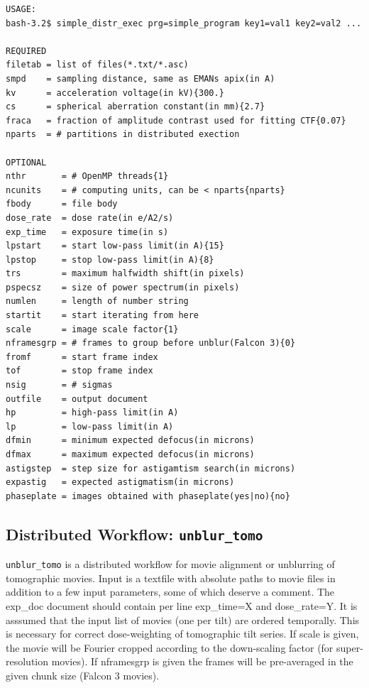 \documentclass[a4paper,11pt]{article}
\newcommand{\prgname}[1]{\textcolor{NavyBlue}{\texttt{#1}}}
\begin{document}
\begin{verbatim}
USAGE:
bash-3.2$ simple_distr_exec prg=simple_program key1=val1 key2=val2 ...

REQUIRED
filetab = list of files(*.txt/*.asc)
smpd    = sampling distance, same as EMANs apix(in A)
kv      = acceleration voltage(in kV){300.}
cs      = spherical aberration constant(in mm){2.7}
fraca   = fraction of amplitude contrast used for fitting CTF{0.07}
nparts  = # partitions in distributed exection

OPTIONAL
nthr       = # OpenMP threads{1}
ncunits    = # computing units, can be < nparts{nparts}
fbody      = file body
dose_rate  = dose rate(in e/A2/s)
exp_time   = exposure time(in s)
lpstart    = start low-pass limit(in A){15}
lpstop     = stop low-pass limit(in A){8}
trs        = maximum halfwidth shift(in pixels)
pspecsz    = size of power spectrum(in pixels)
numlen     = length of number string
startit    = start iterating from here
scale      = image scale factor{1}
nframesgrp = # frames to group before unblur(Falcon 3){0}
fromf      = start frame index
tof        = stop frame index
nsig       = # sigmas
outfile    = output document
hp         = high-pass limit(in A)
lp         = low-pass limit(in A)
dfmin      = minimum expected defocus(in microns)
dfmax      = maximum expected defocus(in microns)
astigstep  = step size for astigamtism search(in microns)
expastig   = expected astigmatism(in microns)
phaseplate = images obtained with phaseplate(yes|no){no}
\end{verbatim}

\subsection{Distributed Workflow: \prgname{unblur\_tomo}}
\label{unblur_tomo}
\prgname{unblur\_tomo} is a distributed workflow for movie alignment or unblurring of tomographic movies. Input is a textfile with absolute paths to movie files in addition to a few input parameters, some of which deserve a comment. The exp\_doc document should contain per line exp\_time=X and dose\_rate=Y. It is asssumed that the input list of movies (one per tilt) are ordered temporally. This is necessary for correct dose-weighting of tomographic tilt series. If scale is given, the movie will be Fourier cropped according to the down-scaling factor (for super-resolution movies). If nframesgrp is given the frames will be pre-averaged in the given chunk size (Falcon 3 movies). 
\end{document}
